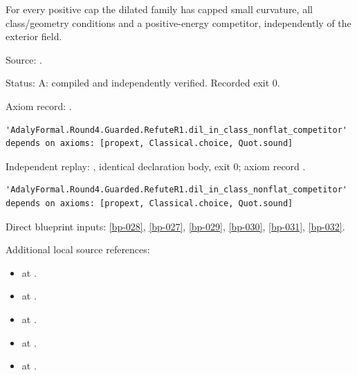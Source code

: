 \begin{theorem}[bp-033]
\label{bp-033}
\leanok
For every positive cap the dilated family has capped small curvature, all class/geometry conditions and a positive-energy competitor, independently of the exterior field.

\par Source: \texttt{}.
\par Status: A: compiled and independently verified. Recorded exit 0.
\par Axiom record: \texttt{}.
\begin{verbatim}
'AdalyFormal.Round4.Guarded.RefuteR1.dil_in_class_nonflat_competitor' depends on axioms: [propext, Classical.choice, Quot.sound]
\end{verbatim}
\par Independent replay: \texttt{}, identical declaration body, exit 0; axiom record \texttt{}.
\begin{verbatim}
'AdalyFormal.Round4.Guarded.RefuteR1.dil_in_class_nonflat_competitor' depends on axioms: [propext, Classical.choice, Quot.sound]
\end{verbatim}
\par Direct blueprint inputs: \ref{bp-028}, \ref{bp-027}, \ref{bp-029}, \ref{bp-030}, \ref{bp-031}, \ref{bp-032}.
\par Additional local source references:
\begin{itemize}
\item \texttt{} at \texttt{}.
\item \texttt{} at \texttt{}.
\item \texttt{} at \texttt{}.
\item \texttt{} at \texttt{}.
\item \texttt{} at \texttt{}.

\end{itemize}
\end{theorem}
